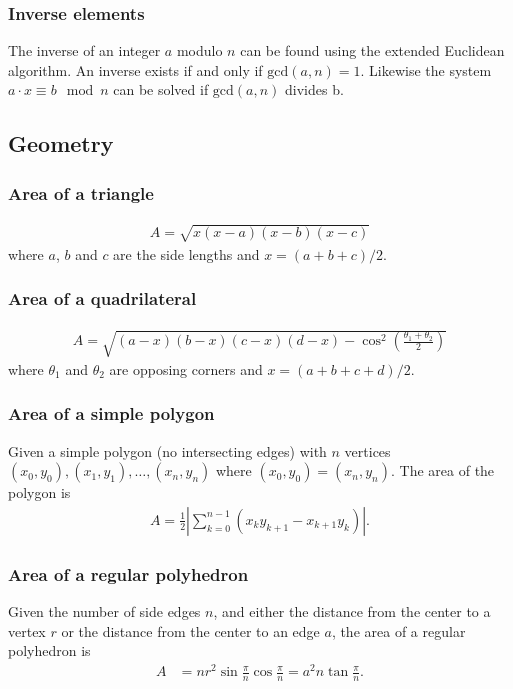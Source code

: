 \subsubsection{Inverse elements}
The inverse of an integer $a$ modulo $n$ can be found using the extended Euclidean algorithm. An inverse exists if and only if $\text{gcd}(a, n) = 1$. Likewise the system $a\cdot x \equiv b \mod n$ can be solved if $\text{gcd}(a, n)$ divides b.



\subsection{Geometry}

\subsubsection{Area of a triangle}
\begin{align*}
    A = \sqrt{x(x - a)(x - b)(x - c)}
\end{align*}
where $a$, $b$ and $c$ are the side lengths and $x = (a + b + c)/2$.

\subsubsection{Area of a quadrilateral}
\begin{align*}
    A = \sqrt{(a-x)(b-x)(c-x)(d-x) - \cos^2\left(\frac{\theta_1 + \theta_2}2\right)}
\end{align*}
where $\theta_1$ and $\theta_2$ are opposing corners and $x = (a + b + c + d)/2$.

\subsubsection{Area of a simple polygon}
Given a simple polygon (no intersecting edges) with $n$ vertices $(x_0, y_0), (x_1, y_1), \dots, (x_n, y_n)$ where $(x_0, y_0) = (x_n, y_n)$. The area of the polygon is
\begin{align*}
    A = \frac12\left|\sum_{k=0}^{n-1} (x_ky_{k+1} - x_{k+1}y_k)\right|.
\end{align*}

\subsubsection{Area of a regular polyhedron}
Given the number of side edges $n$, and either the distance from the center to a vertex $r$ or the distance from the center to an edge $a$, the area of a regular polyhedron is
\begin{align*}
    A &= nr^2\sin\frac{\pi}{n}\cos\frac{\pi}{n} = a^2n\tan\frac{\pi}{n}.
\end{align*}

